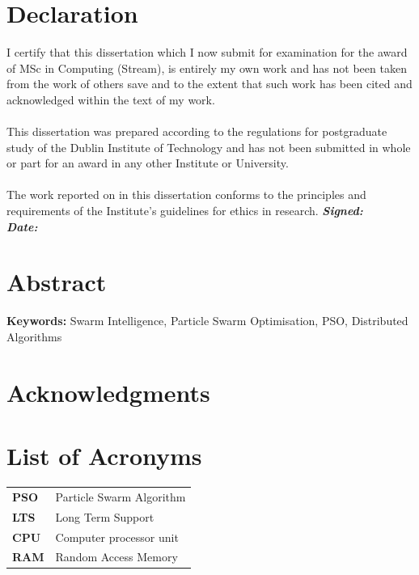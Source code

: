 \documentclass[oneside,12pt]{book}
\begin{document}
\chapter*{Declaration}
I certify that this dissertation which I now submit for examination for the award of
MSc in Computing (Stream), is entirely my own work and has not been taken
from the work of others save and to the extent that such work has been cited and
acknowledged within the text of my work.
\\
\\
This dissertation was prepared according to the regulations for postgraduate study of
the Dublin Institute of Technology and has not been submitted in whole or part for an
award in any other Institute or University.
\\
\\
The work reported on in this dissertation conforms to the principles and requirements
of the Institute’s guidelines for ethics in research.
\vfill
\noindent
\textit{\textbf{Signed:}}  \\

\noindent
\textit{\textbf{Date:}}
\vspace{0.8cm}

\chapter*{Abstract}
\par 

\vfill
\noindent
\textbf{Keywords:} \quad Swarm Intelligence, Particle Swarm Optimisation, PSO, Distributed Algorithms

\chapter*{Acknowledgments}

\newpage
\tableofcontents

\listoffigures

\listoftables

\lstlistoflistings

\chapter*{List of Acronyms}
\begin{table}[H]
  \centering
    \begin{tabular}{ l l }
    \textbf{PSO} & Particle Swarm Algorithm \\
    \textbf{LTS} & Long Term Support \\
    \textbf{CPU} & Computer processor unit \\
    \textbf{RAM} & Random Access Memory \\
    \end{tabular}
\end{table}
\end{document}
